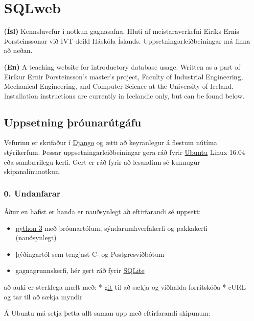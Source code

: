 \section*{SQLweb}\label{sqlweb}

\textbf{(Ísl)} Kennsluvefur í notkun gagnasafna. Hluti af
meistaraverkefni Eiríks Ernis Þorsteinssonar við IVT-deild Háskóla
Íslands. Uppsetningarleiðbeiningar má finna að neðan.

\textbf{(En)} A teaching website for introductory database usage.
Written as a part of Eiríkur Ernir Þorsteinsson's master's project,
Faculty of Industrial Engineering, Mechanical Engineering, and Computer
Science at the University of Iceland. Installation instructions are
currently in Icelandic only, but can be found below.

\subsection*{Uppsetning
þróunarútgáfu}\label{uppsetning-uxferuxf3unaruxfatguxe1fu}

Vefurinn er skrifaður í \href{https://www.djangoproject.com/}{Django} og
ætti að keyranlegur á flestum nútíma stýrikerfum. Þessar
uppsetningarleiðbeiningar gera ráð fyrir
\href{https://www.ubuntu.com/}{Ubuntu} Linux 16.04 eða sambærilegu
kerfi. Gert er ráð fyrir að lesandinn sé kunnugur skipanalínunotkun.

\subsubsection{0. Undanfarar}\label{undanfarar}

Áður en hafist er handa er nauðsynlegt að eftirfarandi sé uppsett:

\begin{itemize}
\item
  \href{https://www.python.org/downloads/}{python 3} með þróunartólum,
  sýndarumhverfakerfi og pakkakerfi (nauðsynlegt)
\item
  þýðingartól sem tengjast C- og Postgresviðbótum
\item
  gagnagrunnskerfi, hér gert ráð fyrir
  \href{https://sqlite.org/}{SQLite}
\end{itemize}

að auki er sterklega mælt með: * \href{https://git-scm.com/}{git} til að
sækja og viðhalda forritskóða * cURL og tar til að sækja myndir

Á Ubuntu má setja þetta allt saman upp með eftirfarandi skipunum:

